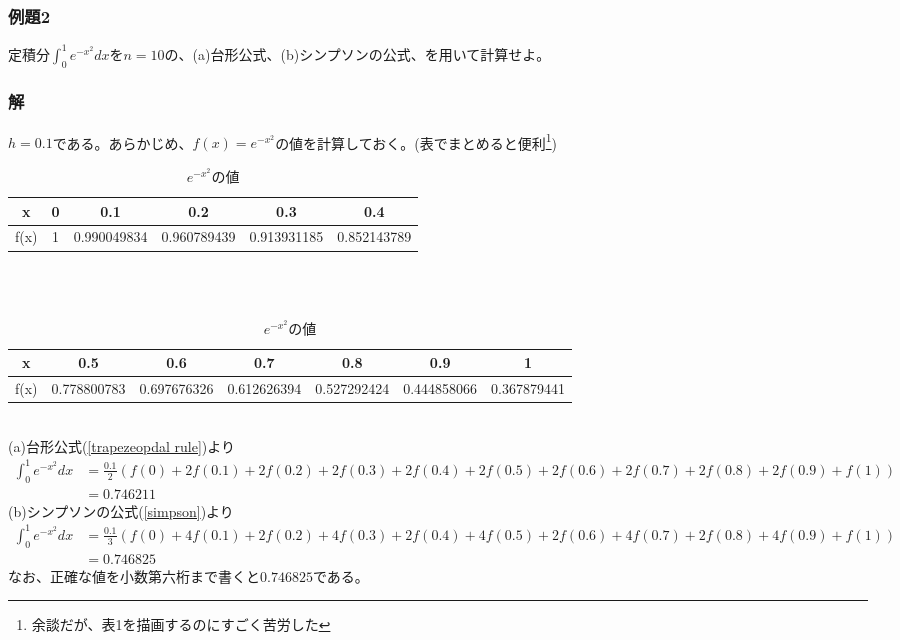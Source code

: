 \documentclass[a4j,dvipdfmx]{jsarticle}
\begin{document}
\subsubsection*{例題2}
定積分$\int_0^1e^{-x^2}dx$を$n=10$の、(a)台形公式、(b)シンプソンの公式、を用いて計算せよ。
\subsubsection*{解}
$h=0.1$である。あらかじめ、$f(x)=e^{-x^2}$の値を計算しておく。(表でまとめると便利\footnote{余談だが、表1を描画するのにすごく苦労した})\\
\begin{table}[h]
    \caption{$e^{-x^2}$の値}
    \begin{tabular}{|c||c|c|c|c|c|} \hline
        x    & 0    & 0.1        & 0.2        & 0.3        & 0.4        \\ \hline
        f(x) & 1    &0.990049834 &0.960789439 &0.913931185 &0.852143789 \\ \hline
    \end{tabular}
    \\\\
    \begin{tabular}{|c||c|c|c|c|c|c|} \hline
        x    & 0.5        & 0.6        & 0.7        & 0.8        & 0.9        & 1  \\ \hline
        f(x) &0.778800783 &0.697676326 &0.612626394 &0.527292424 &0.444858066 &0.367879441 \\ \hline
    \end{tabular} 
\end{table}
\\
(a)台形公式(\ref{trapezeopdal rule})より
\begin{align*}
    \int_0^1e^{-x^2}dx&=\frac{0.1}{2}(f(0)+2f(0.1)+2f(0.2)+2f(0.3)+2f(0.4)+2f(0.5)+2f(0.6)+2f(0.7)+2f(0.8)+2f(0.9)+f(1))\\
                      &=0.746211
\end{align*}
(b)シンプソンの公式(\ref{simpson})より
\begin{align*}
    \int_0^1e^{-x^2}dx&=\frac{0.1}{3}(f(0)+4f(0.1)+2f(0.2)+4f(0.3)+2f(0.4)+4f(0.5)+2f(0.6)+4f(0.7)+2f(0.8)+4f(0.9)+f(1))\\
                      &=0.746825
\end{align*}
なお、正確な値を小数第六桁まで書くと$0.746825$である。\\
\end{document}
